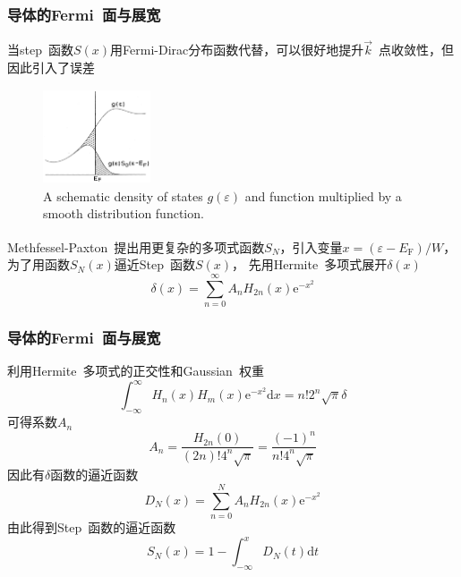 \documentclass[cjk,slidestop,compress,mathserif,blue]{beamer}
\newcommand{\upcite}[1]{\hspace{0ex}\textsuperscript{\cite{#1}}} %
\begin{document}
\frame
{
	\frametitle{导体的\textrm{Fermi}~面与展宽}
	当\textrm{step~}函数$S(x)$用\textrm{Fermi-Dirac}分布函数代替，可以很好地提升$\vec k$~点收敛性，但因此引入了误差
	\begin{figure}[h!]
	\centering
	\vspace*{-0.2in}
	\includegraphics[height=1.1in,width=1.25in,viewport=0 0 530 500,clip]{Figures/MP_distribution.png}
	\caption{\textrm{A schematic density of states $g(\varepsilon)$ and function multiplied by a smooth distribution function.}}%
	\label{MP_distribution}
	\end{figure} 
	\textrm{Methfessel-Paxton~}提出用更复杂的多项式函数$S_N$\upcite{PRB40-3616_1989}，引入变量$x=(\varepsilon-E_{\mathrm F})/W$，为了用函数$S_N(x)$逼近\textrm{Step~}函数$S(x)$，%
	先用\textrm{Hermite~}多项式展开$\delta(x)$
	\vspace*{-8pt}
	\begin{displaymath}
		\delta(x)=\sum_{n=0}^{\infty}A_nH_{2n}(x)\mathrm{e}^{-x^2}
	\end{displaymath}
}

\frame
{
	\frametitle{导体的\textrm{Fermi}~面与展宽}
	利用\textrm{Hermite~}多项式的正交性和\textrm{Gaussian~}权重
	\begin{displaymath}
		\int_{-\infty}^{\infty}H_n(x)H_m(x)\mathrm{e}^{-x^2}\mathrm{d}x=n!2^n\sqrt{\pi}\delta
	\end{displaymath}
	可得系数$A_n$
	\begin{displaymath}
		A_n=\frac{H_{2n}(0)}{(2n)!4^n\sqrt{\pi}}=\frac{(-1)^n}{n!4^n\sqrt{\pi}}
	\end{displaymath}
	因此有$\delta$函数的逼近函数
	\begin{displaymath}
		D_N(x)=\sum_{n=0}^NA_nH_{2n}(x)\mathrm{e}^{-x^2}
	\end{displaymath}
	由此得到\textrm{Step}~函数的逼近函数
	\begin{displaymath}
		S_N(x)=1-\int_{-\infty}^xD_N(t)\mathrm{d}t
	\end{displaymath}
}
\end{document}

